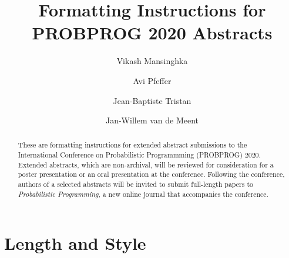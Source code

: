 \documentclass[anonymous=false, %
               format=acmsmall, %
               review=true, %
               screen=true, %
               nonacm=true]{acmart}
\begin{document}
\title{Formatting Instructions for PROBPROG 2020 Abstracts}

\author{Vikash Mansinghka}

\author{Avi Pfeffer}

\author{Jean-Baptiste Tristan}

\author{Jan-Willem van de Meent}

\begin{abstract}
These are formatting instructions for extended abstract submissions to the International Conference on Probabilistic Programmming (PROBPROG) 2020. Extended abstracts, which are non-archival, will be reviewed for consideration for a poster presentation or an oral presentation at the conference. Following the conference, authors of a selected abstracts will be invited to submit full-length papers to \emph{Probabilistic Programming}, a new online journal that accompanies the conference.
\end{abstract}

\maketitle

\section{Length and Style}
\end{document}
